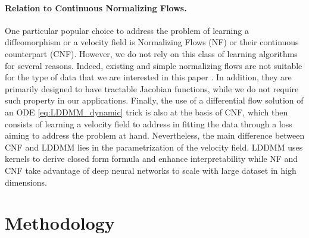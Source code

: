     
\paragraph{Relation to Continuous Normalizing Flows.}

One particular popular choice to address the problem of learning a diffeomorphism or a velocity field is Normalizing Flows \cite{rezende2015variational,kobyzev2020normalizing} (NF) or their continuous counterpart \cite{chen2018neural,grathwohl2019scalable,salman2018deep} (CNF).
However, we do not rely on this class of learning algorithms for several reasons. Indeed, existing and simple normalizing flows are not suitable for the type of data that we are interested in this paper \cite{feng2023multi,deng2020modeling}. 
  In addition,  they are primarily designed to have tractable Jacobian functions, while we do not require such property in our applications. 
Finally, the use of a differential flow solution of an ODE
\eqref{eq:LDDMM_dynamic} trick is also at the basis of CNF, which
then consists of learning a velocity field to address in fitting the data through a loss aiming to address the problem
at hand. Nevertheless, the main difference between CNF and LDDMM lies in the
parametrization of the velocity field. LDDMM uses kernels to
derive closed form formula and enhance interpretability while
NF and CNF take advantage of deep neural networks to scale with
large dataset in high dimensions.
\section{Methodology}

